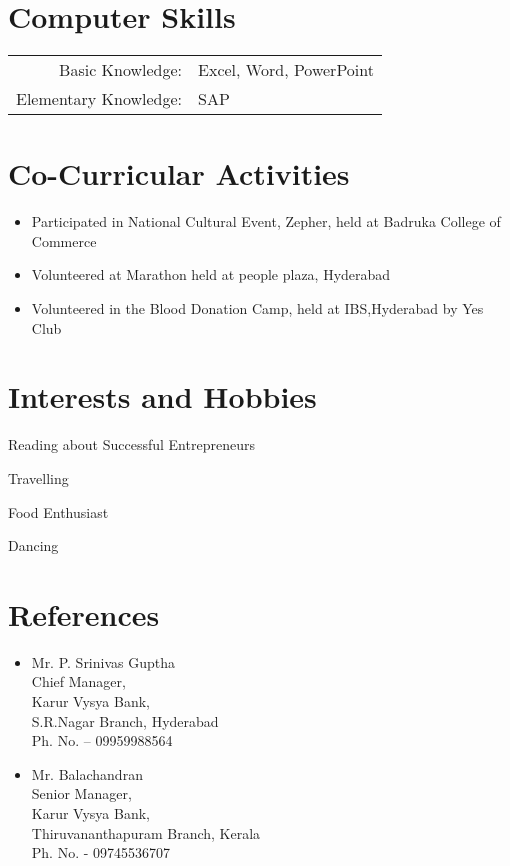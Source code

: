 \documentclass[a4paper,10pt]{article}
\begin{document}
\section{Computer Skills}
\begin{tabular}{rl}
 Basic Knowledge:& Excel, Word, PowerPoint \\
 Elementary Knowledge:& SAP \\
\end{tabular}
\section{Co-Curricular Activities}
\begin{itemize}
\item Participated in National Cultural Event, Zepher, held at Badruka College of Commerce
\item Volunteered at Marathon held at people plaza, Hyderabad
\item Volunteered in the Blood Donation Camp, held at IBS,Hyderabad by Yes Club
\end{itemize}

\section{Interests and Hobbies}
\begin{multicols}{2}
    \item Reading about Successful Entrepreneurs
    \item Travelling
    \item Food Enthusiast
    \item Dancing
\end{multicols}

\section{References}
\begin{multicols}{2}
\begin{itemize}
\item Mr. P. Srinivas Guptha \\
Chief Manager, \\
Karur Vysya Bank, \\
S.R.Nagar Branch, Hyderabad \\
Ph. No. – 09959988564 \\
\item Mr. Balachandran \\
Senior Manager, \\
Karur Vysya Bank, \\
Thiruvananthapuram Branch, Kerala \\
Ph. No. - 09745536707 \\
\end{itemize}
\end{multicols}
\end{document}
